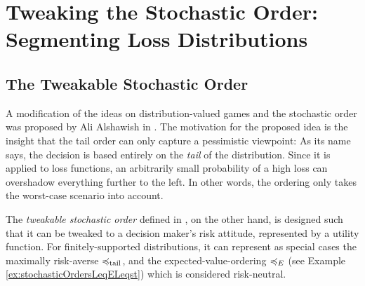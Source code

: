 \documentclass[a4paper]{scrreprt}
\theoremstyle{definition}
\begin{document}
    \chapter{Tweaking the Stochastic Order: Segmenting Loss Distributions}
    \label{chap:segmentingLossDistributions}
    
    \section{The Tweakable Stochastic Order}
    A modification of the ideas on distribution-valued games and the stochastic order was proposed by Ali Alshawish in \cite{bib:tweakableStochasticOrders}.
    The motivation for the proposed idea is the insight that the tail order can only capture a pessimistic viewpoint: As its name says, the decision is based entirely on the \emph{tail} of the distribution. Since it is applied to loss functions, an arbitrarily small probability of a high loss can overshadow everything further to the left. In other words, the ordering only takes the worst-case scenario into account.
        
    The \emph{tweakable stochastic order} defined in \cite{bib:tweakableStochasticOrders}, on the other hand,
    is designed such that it can be tweaked to a decision maker's risk attitude, represented by a utility function.
    For finitely-supported distributions, it can represent as special cases the maximally risk-averse $\preccurlyeq_{\text{tail}}$, and the expected-value-ordering $\preccurlyeq_E$ (see Example \ref{ex:stochasticOrdersLeqELeqst}) which is considered risk-neutral.
    
\end{document}
